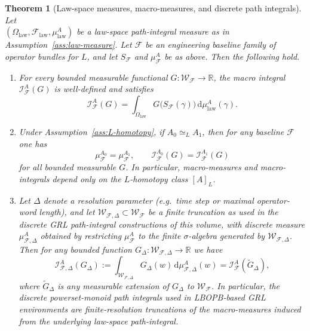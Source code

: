 \documentclass[11pt]{book}
\theoremstyle{plain}
\newtheorem{theorem}{Theorem}[chapter]
\theoremstyle{definition}
\theoremstyle{remark}
\newcommand{\R}{\mathbb{R}}
\begin{document}
\begin{theorem}[Law-space measures, macro-measures, and discrete path integrals]
\label{thm:law-macro-discrete}
Let \\$(\Omega_{\mathrm{law}}, \mathcal{F}_{\mathrm{law}}, \mu_{\mathrm{law}}^A)$
be a law-space path-integral measure as in
Assumption~\ref{ass:law-measure}.
Let $\mathcal{F}$ be an engineering baseline family of operator bundles
for $L$, and let $S_{\mathcal{F}}$ and $\mu_{\mathcal{F}}^A$ be as
above.
Then the following hold.
\begin{enumerate}
  \item For every bounded measurable functional
        $G : \mathcal{W}_{\mathcal{F}} \to \R$, the macro integral
        $\mathcal{I}_{\mathcal{F}}^A(G)$ is well-defined and satisfies
        \[
          \mathcal{I}_{\mathcal{F}}^A(G)
          =
          \int_{\Omega_{\mathrm{law}}}
            G\bigl(S_{\mathcal{F}}(\gamma)\bigr)\,
            \mathrm{d}\mu_{\mathrm{law}}^A(\gamma).
        \]
  \item Under Assumption~\ref{ass:L-homotopy}, if $A_0\simeq_L A_1$,
        then for any baseline $\mathcal{F}$ one has
        \[
          \mu_{\mathcal{F}}^{A_0} = \mu_{\mathcal{F}}^{A_1},
          \qquad
          \mathcal{I}_{\mathcal{F}}^{A_0}(G)
          = \mathcal{I}_{\mathcal{F}}^{A_1}(G)
        \]
        for all bounded measurable $G$.
        In particular, macro-measures and macro-integrals depend only on
        the $L$-homotopy class $[A]_L$.
  \item Let $\Delta$ denote a resolution parameter (e.g.\ time step or
        maximal operator-word length), and let
        $\mathcal{W}_{\mathcal{F},\Delta}\subset\mathcal{W}_{\mathcal{F}}$
        be a finite truncation as used in the discrete GRL path-integral
        constructions of this volume, with discrete measure
        $\mu_{\mathcal{F},\Delta}^A$ obtained by restricting
        $\mu_{\mathcal{F}}^A$ to the finite $\sigma$-algebra generated
        by $\mathcal{W}_{\mathcal{F},\Delta}$.
        Then for any bounded function
        $G_\Delta : \mathcal{W}_{\mathcal{F},\Delta}\to\R$ we have
        \[
          \mathcal{I}_{\mathcal{F},\Delta}^A(G_\Delta)
          :=
          \int_{\mathcal{W}_{\mathcal{F},\Delta}}
            G_\Delta(w)\,\mathrm{d}\mu_{\mathcal{F},\Delta}^A(w)
          =
          \mathcal{I}_{\mathcal{F}}^A(\widetilde{G}_\Delta),
        \]
        where $\widetilde{G}_\Delta$ is any measurable extension of
        $G_\Delta$ to $\mathcal{W}_{\mathcal{F}}$.
        In particular, the discrete powerset-monoid path integrals used
        in LBOPB-based GRL environments are finite-resolution truncations
        of the macro-measures induced from the underlying law-space
        path-integral.
\end{enumerate}
\end{theorem}
\end{document}
